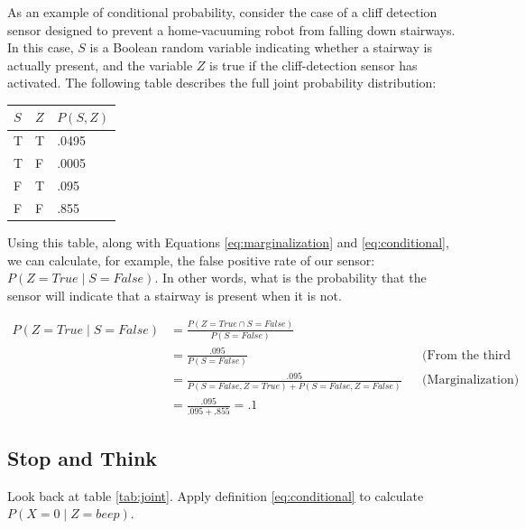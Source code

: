 As an example of conditional probability, consider the case of a cliff
detection sensor designed to prevent a home-vacuuming robot from
falling down stairways.  In this case, $S$ is a Boolean random
variable indicating whether a stairway is actually present,
and the variable $Z$ is true if the cliff-detection sensor has
activated. The following table describes the full joint probability
distribution:


\begin{table}[h!]
  \begin{center}
    \begin{tabular}[b]{|l|l|l|}
      \hline
      $S$  & $Z$          & $P(S, Z)$ \\
      \hline
      T  & T & .0495    \\
      \hline
      T  & F & .0005    \\
      \hline
      F  & T & .095   \\
      \hline
      F  & F & .855   \\
      \hline
    \end{tabular}
  \end{center}
\end{table}

Using this table, along with Equations \ref{eq:marginalization} and
\ref{eq:conditional}, we can calculate, for example, the false
positive rate of our sensor: $P(Z = True \mid S = False)$.  In other words,
what is the probability that the sensor will indicate that a stairway
is present when it is not.

\[
\begin{split}
  P(Z = True \mid S= False) &= \frac{P(Z = True \cap S = False)}{P(S = False)} && \\
  & =  \frac{.095}{P(S = False)}&& \text{(From the third row of the table above)} \\
  & =  \frac{.095}{P(S = False, Z = True) + P(S = False, Z = False)}&&\text{(Marginalization)} \\
  & =  \frac{.095}{.095 + .855} = .1 &&
\end{split}
\]

\subsection*{Stop and Think}

\begin{exercise}
  Look back at table \ref{tab:joint}.  Apply definition \ref{eq:conditional} to calculate $P(X=0 \mid Z=beep)$.
\end{exercise}



